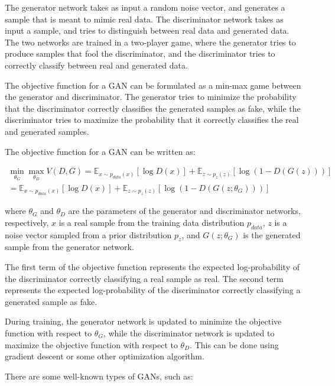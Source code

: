 The generator network takes as input a random noise vector, and generates a sample that is meant to mimic real data. The discriminator network takes as input a sample, and tries to distinguish between real data and generated data. The two networks are trained in a two-player game, where the generator tries to produce samples that fool the discriminator, and the discriminator tries to correctly classify between real and generated data.

The objective function for a GAN can be formulated as a min-max game between the generator and discriminator. The generator tries to minimize the probability that the discriminator correctly classifies the generated samples as fake, while the discriminator tries to maximize the probability that it correctly classifies the real and generated samples.

The objective function for a GAN can be written as:

\begin{equation}
\begin{split}
	\min_{\theta_G}\max_{\theta_D} V(D, G) = \mathbb{E}_{x\sim p_{data}(x)}[\log D(x)] + \mathbb{E}_{z\sim p_z(z)}[\log(1-D(G(z)))] \\
	= \mathbb{E}_{x\sim p_{data}(x)}[\log D(x)] + \mathbb{E}_{z\sim p_z(z)}[\log(1-D(G(z;\theta_G)))]
\end{split}
\end{equation}

where $\theta_G$ and $\theta_D$ are the parameters of the generator and discriminator networks, respectively, $x$ is a real sample from the training data distribution $p_{data}$, $z$ is a noise vector sampled from a prior distribution $p_z$, and $G(z;\theta_G)$ is the generated sample from the generator network.

The first term of the objective function represents the expected log-probability of the discriminator correctly classifying a real sample as real. The second term represents the expected log-probability of the discriminator correctly classifying a generated sample as fake.

During training, the generator network is updated to minimize the objective function with respect to $\theta_G$, while the discriminator network is updated to maximize the objective function with respect to $\theta_D$. This can be done using gradient descent or some other optimization algorithm.

There are some well-known types of GANs, such as:

